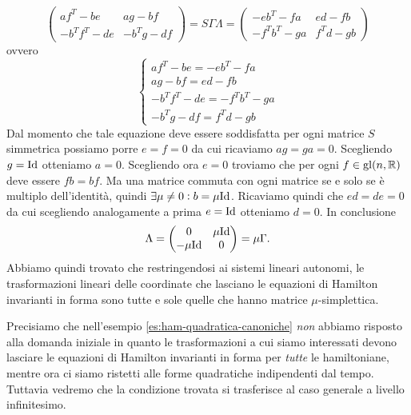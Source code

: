 \begin{example}
\[\begin{pmatrix}
            a f^T - b e & a g - b f \\
            - b^T f^T - d e & - b^T g - d f
        \end{pmatrix}
        =
        S \Gamma \Lambda
        =
        \begin{pmatrix}
            -e b^T - f a & e d - f b \\
            -f^T b^T - g a & f^T d - g b
        \end{pmatrix}
    \]
    ovvero
    \begin{equation}
        \begin{cases}
            a f^T - b e = -e b^T - f a \\
            a g - b f = e d - f b \\
            - b^T f^T - d e = -f^T b^T - g a \\
            - b^T g - d f  = f^T d - g b
        \end{cases}
    \end{equation}
    Dal momento che tale equazione deve essere soddisfatta per ogni matrice $ S $ simmetrica possiamo porre $ e = f = 0 $ da cui ricaviamo $ a g = g a = 0 $. Scegliendo $ g = \mathrm{Id} $ otteniamo $ a = 0 $. Scegliendo ora $ e = 0 $ troviamo che per ogni $ f \in \mathrm{gl}(n, \mathbb{R}) $ deve essere $ f b = b f $. Ma una matrice commuta con ogni matrice se e solo se è multiplo dell'identità, quindi $ \exists \mu \neq 0 : b = \mu \mathrm{Id} $. Ricaviamo quindi che $ e d =  d e = 0 $ da cui scegliendo analogamente a prima $ e = \mathrm{Id} $ otteniamo $ d = 0 $. In conclusione
    \[
        \Lambda =
        \begin{pmatrix}
        0 & \mu \mathrm{Id} \\
        - \mu \mathrm{Id} & 0
        \end{pmatrix}
        = \mu \Gamma.
    \]
    Abbiamo quindi trovato che restringendosi ai sistemi lineari autonomi, le trasformazioni lineari delle coordinate che lasciano le equazioni di Hamilton invarianti in forma sono tutte e sole quelle che hanno matrice $ \mu $-simplettica.
\end{example}

Precisiamo che nell'esempio \ref{es:ham-quadratica-canoniche} \emph{non} abbiamo risposto alla domanda iniziale in quanto le trasformazioni a cui siamo interessati devono lasciare le equazioni di Hamilton invarianti in forma per \emph{tutte} le hamiltoniane, mentre ora ci siamo ristetti alle forme quadratiche indipendenti dal tempo. Tuttavia vedremo che la condizione trovata si trasferisce al caso generale a livello infinitesimo.

